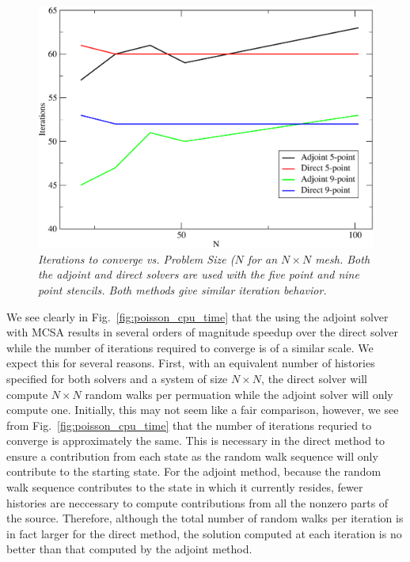 \documentclass[preprint,12pt]{elsarticle}
\begin{document}
\begin{figure}[htbp!]
  \centering
  \includegraphics[width=5in,clip]{Adjoint_Direct_Iterations.pdf}
  \caption{\sl Iterations to converge vs. Problem Size ($N$ for an $N
    \times N$ mesh. Both the adjoint and direct solvers are used with
    the five point and nine point stencils. Both methods give similar
    iteration behavior.}
  \label{fig:poisson_iterations}
\end{figure}

We see clearly in Fig.~\ref{fig:poisson_cpu_time} that the using the
adjoint solver with MCSA results in several orders of magnitude
speedup over the direct solver while the number of iterations required
to converge is of a similar scale. We expect this for several
reasons. First, with an equivalent number of histories specified for
both solvers and a system of size $N \times N$, the direct solver will
compute $N \times N$ random walks per permuation while the adjoint solver
will only compute one. Initially, this may not seem like a fair
comparison, however, we see from Fig.~\ref{fig:poisson_cpu_time} that
the number of iterations requried to converge is approximately the
same. This is necessary in the direct method to ensure a contribution
from each state as the random walk sequence will only contribute to
the starting state. For the adjoint method, because the random walk
sequence contributes to the state in which it currently resides, fewer
histories are neccessary to compute contributions from all the nonzero
parts of the source. Therefore, although the total number of random
walks per iteration is in fact larger for the direct method, the
solution computed at each iteration is no better than that computed by
the adjoint method.
\end{document}
